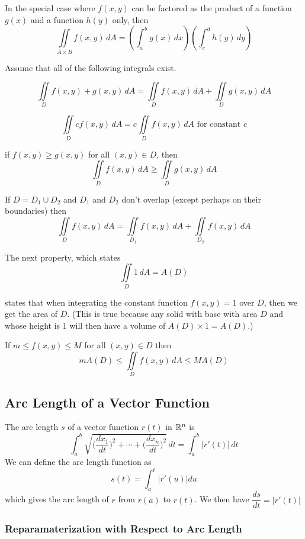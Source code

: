  In the special case where $f(x,y)$ can be factored as the product of a function $g(x)$ and a function $h(y)$ only, then $$\iint\limits_{A \times B} f(x,y) \, dA = \left(\int_a^b g(x) \, dx \right) \left(\int_c^d h(y) \, dy \right)$$





Assume that all of the following integrals exist.

$$\iint\limits_{D} f(x,y) + g(x,y) \, dA = \iint\limits_{D} f(x,y) \, dA + \iint\limits_{D} g(x,y) \, dA$$

$$\iint\limits_{D} cf(x,y) \, dA = c\iint\limits_{D} f(x,y) \, dA \text{ for constant } c $$

if $f(x,y) \geq g(x,y)$ for all $(x,y) \in D$, then $$ \iint\limits_{D} f(x,y) \, dA \geq \iint\limits_{D} g(x,y) \, dA $$

If $D = D_{1} \cup D_{2}$ and $D_{1}$ and $D_{2}$ don't overlap (except perhaps on their boundaries) then $$ \iint\limits_{D} f(x,y) \, dA = \iint\limits_{D_{1}} f(x,y) \, dA + \iint\limits_{D_{2}} f(x,y) \, dA $$

The next property, which states $$ \iint\limits_{D} 1 \, dA = A(D) $$

states that when integrating the constant function $f(x,y) = 1$ over $D$, then we get the area of $D$. (This is true because any solid with base with area $D$ and whose height is $1$ will then have a volume of $A(D) \times 1 = A(D)$.)

If $m \leq f(x,y) \leq M$ for all $(x,y) \in D$ then $$ mA(D) \leq \iint\limits_{D} f(x,y) \, dA \leq MA(D) $$

\subsection{Arc Length of a Vector Function}

The arc length $s$ of a vector function $r(t)$ in $\mathbb{R}^n$ is $$\int_{a}^{b} \sqrt{\Big(\frac{dx_1}{dt}\Big)^{2} + \cdots + \Big(\frac{dx_n}{dt}\Big)^{2}} \, dt = \int_{a}^{b} |r'(t)|\, dt $$ We can define the arc length function as $$s(t) = \int_{a}^{t} |r'(u)| du $$ which gives the arc length of $r$ from $r(a)$ to $r(t)$. We then have $\dfrac{ds}{dt}=|r'(t)|$

\subsubsection{Reparamaterization with Respect to Arc Length}

